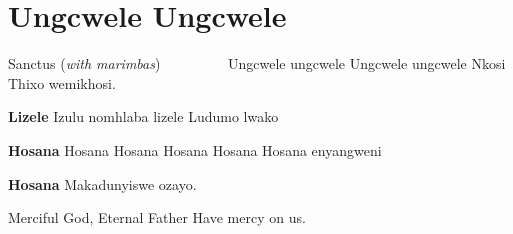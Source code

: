 \starttocol
\chapter{Ungcwele Ungcwele}
\nexttocol
S{\sc anctus}\hfill{\it }
\stoptocol
\starttocol
\startlines
 \hfill({\it with marimbas})~~~~~~~~~
U{\sc ngcwele} ungcwele
Ungcwele ungcwele
Nkosi Thixo wemikhosi.

{\bf Lizele}
Izulu nomhlaba lizele
Ludumo lwako

{\bf Hosana}
Hosana Hosana
Hosana Hosana
Hosana enyangweni

{\bf Hosana}
Makadunyiswe ozayo.
\stoplines
\nexttocol
~

Merciful God, Eternal Father
Have mercy on us.
\stoptocol
